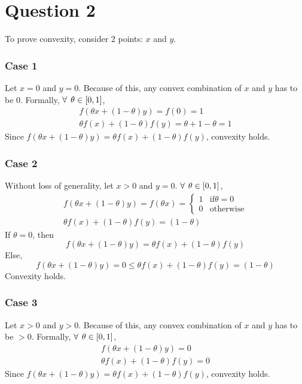 \documentclass[11pt]{article}
\begin{document}
\section*{Question 2}
\begin{flushleft}
To prove convexity, consider 2 points: \(x\) and \(y\).
\subsubsection*{Case 1}
Let \(x = 0\) and \(y = 0\). Because of this, any convex combination of \(x\) and \(y\) has to be \(0\). Formally, \(\forall \hspace{1.5mm} \theta \in [0, 1]\),
\begin{gather*}
f(\theta x + (1 - \theta) y) = f(0) = 1 \\
\theta f(x) + (1 - \theta) f(y) = \theta + 1 - \theta = 1
\end{gather*}
Since \(f(\theta x + (1 - \theta) y) = \theta f(x) + (1 - \theta) f(y)\), convexity holds.

\subsubsection*{Case 2}
Without loss of generality, let \(x > 0\) and \(y = 0\). \(\forall \hspace{1.5mm} \theta \in [0, 1]\),
\begin{gather*}
f(\theta x + (1 - \theta)y) = f(\theta x) = \begin{cases} 1 & \text{if} \theta = 0 \\ 0 & \text{otherwise} \end{cases} \\
\theta f(x) + (1 - \theta) f(y) = (1 - \theta)
\end{gather*}
If \(\theta = 0\), then \[f(\theta x + (1 - \theta)y) = \theta f(x) + (1 - \theta) f(y)\] Else, \[f(\theta x + (1 - \theta)y) = 0 \leq \theta f(x) + (1 - \theta) f(y) = (1  - \theta)\] Convexity holds.

\subsubsection*{Case 3}
Let \(x > 0\) and \(y > 0\). Because of this, any convex combination of \(x\) and \(y\) has to be \(> 0\). Formally, \(\forall \hspace{1.5mm} \theta \in [0, 1]\),
\begin{gather*}
f(\theta x + (1 - \theta)y) = 0 \\
\theta f(x) + (1 - \theta) f(y) = 0
\end{gather*}
Since \(f(\theta x + (1 - \theta) y) = \theta f(x) + (1 - \theta) f(y)\), convexity holds.


\end{flushleft}
\end{document}
